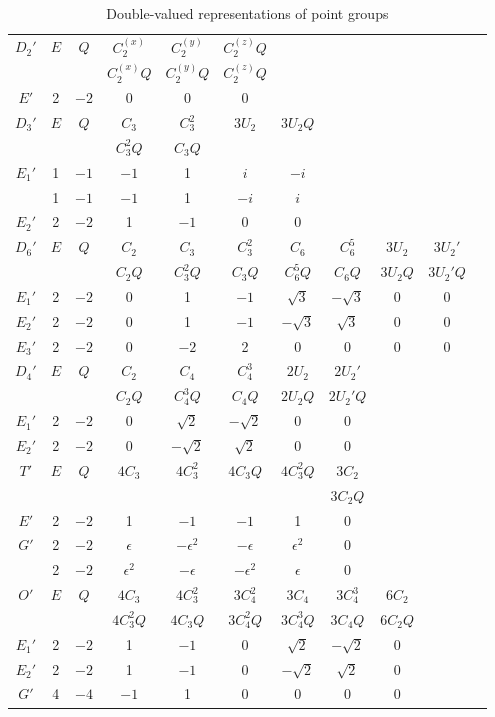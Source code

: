 \setcounter{table}{7}
\begin{table}[!htbp]
\centering
\caption{Double-valued representations of point groups}
\scriptsize
\setlength{\tabcolsep}{3.2pt}
\renewcommand{\arraystretch}{1.18}
\begin{tabular}{c|*{10}{c}}
\hline
$D_2'$&$E$&$Q$&$C_2^{(x)}$&$C_2^{(y)}$&$C_2^{(z)}Q$\\
&&&$C_2^{(x)}Q$&$C_2^{(y)}Q$&$C_2^{(z)}Q$\\ \hline
$E'$&2&$-2$&0&0&0\\ \hline
$D_3'$&$E$&$Q$&$C_3$&$C_3^2$&$3U_2$&$3U_2Q$\\
&&&$C_3^2Q$&$C_3Q$&&\\ \hline
$E_1'$&1&$-1$&$-1$&1&$i$&$-i$\\
&1&$-1$&$-1$&1&$-i$&$i$\\
$E_2'$&2&$-2$&1&$-1$&0&0\\ \hline
$D_6'$&$E$&$Q$&$C_2$&$C_3$&$C_3^2$&$C_6$&$C_6^5$&$3U_2$&$3U_2'$\\
&&&$C_2Q$&$C_3^2Q$&$C_3Q$&$C_6^5Q$&$C_6Q$&$3U_2Q$&$3U_2'Q$\\ \hline
$E_1'$&2&$-2$&0&1&$-1$&$\sqrt3$&$-\sqrt3$&0&0\\
$E_2'$&2&$-2$&0&1&$-1$&$-\sqrt3$&$\sqrt3$&0&0\\
$E_3'$&2&$-2$&0&$-2$&2&0&0&0&0\\ \hline
$D_4'$&$E$&$Q$&$C_2$&$C_4$&$C_4^3$&$2U_2$&$2U_2'$\\
&&&$C_2Q$&$C_4^3Q$&$C_4Q$&$2U_2Q$&$2U_2'Q$\\ \hline
$E_1'$&2&$-2$&0&$\sqrt2$&$-\sqrt2$&0&0\\
$E_2'$&2&$-2$&0&$-\sqrt2$&$\sqrt2$&0&0\\ \hline
$T'$&$E$&$Q$&$4C_3$&$4C_3^2$&$4C_3Q$&$4C_3^2Q$&$3C_2$\\
&&&&&&&$3C_2Q$\\ \hline
$E'$&2&$-2$&1&$-1$&$-1$&1&0\\
$G'$&2&$-2$&$\epsilon$&$-\epsilon^2$&$-\epsilon$&$\epsilon^2$&0\\
&2&$-2$&$\epsilon^2$&$-\epsilon$&$-\epsilon^2$&$\epsilon$&0\\ \hline
$O'$&$E$&$Q$&$4C_3$&$4C_3^2$&$3C_4^2$&$3C_4$&$3C_4^3$&$6C_2$\\
&&&$4C_3^2Q$&$4C_3Q$&$3C_4^2Q$&$3C_4^3Q$&$3C_4Q$&$6C_2Q$\\ \hline
$E_1'$&2&$-2$&1&$-1$&0&$\sqrt2$&$-\sqrt2$&0\\
$E_2'$&2&$-2$&1&$-1$&0&$-\sqrt2$&$\sqrt2$&0\\
$G'$&4&$-4$&$-1$&1&0&0&0&0\\ \hline
\end{tabular}
\end{table}
\clearpage

